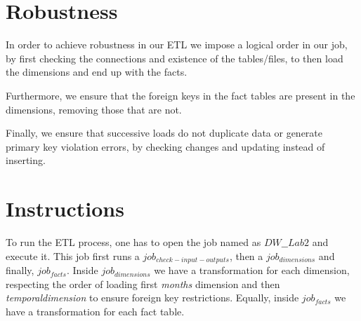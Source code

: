 \documentclass{article} %
\begin{document}
\section{Robustness}

In order to achieve robustness in our ETL we impose a logical order in our job, by first checking the connections and existence of the tables/files, to then load the dimensions and end up with the facts.

Furthermore, we ensure that the foreign keys in the fact tables are present in the dimensions, removing those that are not.

Finally, we ensure that successive loads do not duplicate data or generate primary key violation errors, by checking changes and updating instead of inserting.

\section{Instructions}

To run the ETL process, one has to open the job named as $DW\_\_Lab2$ and execute it. This job first runs a $job_{check-input-outputs}$, then a $job_{dimensions}$ and finally, $job_{facts}$. Inside $job_{dimensions}$ we have a transformation for each dimension, respecting the order of loading first \textit{months} dimension and then \textit{temporaldimension} to ensure foreign key restrictions. Equally, inside $job_{facts}$ we have a transformation for each fact table.
\end{document}

